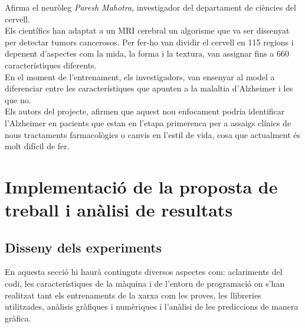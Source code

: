 \documentclass[a4paper,12pt]{report}
\begin{document}
\begin{center}
\begin{minipage}{0.9\linewidth}
{\begin{center}
\begin{minipage}{0.9\linewidth}
{                    }
                    \vspace{20pt}
                \end{minipage}
            \end{center}
            Afirma el neuròleg \textit{Paresh Mahotra}, investigador del departament de ciències del cervell.\\
            Els científics han adaptat a un MRI cerebral un algorisme que va ser dissenyat per detectar tumors cancerosos. Per fer-ho van dividir el cervell en 115 regions i depenent d'aspectes com la mida, la forma i la textura, van assignar fins a 660 característiques diferents.\\
            En el moment de l'entrenament, els investigadors, van ensenyar al model a diferenciar entre les característiques que apunten a la malaltia d'Alzheimer i les que no.\\
            Els autors del projecte, afirmen que aquest nou enfocament podria identificar l'Alzheimer en pacients que estan en l'etapa primerenca per a assaigs clínics de nous tractaments farmacològics o canvis en l'estil de vida, cosa que actualment és molt difícil de fer.
        }
        \vspace{5pt}
    \end{minipage}
\end{center}

\chapter*{Implementació de la proposta de treball i anàlisi de resultats}
\section*{Disseny dels experiments}
 En aquesta secció hi haurà continguts diversos aspectes com: aclariments del codi, les característiques de la màquina i de l'entorn de programació on s'han realitzat tant els entrenaments de la xarxa com les proves, les llibreries utilitzades, anàlisis gràfiques i numèriques i l'anàlisi de les prediccions de manera gràfica.
\end{document}
